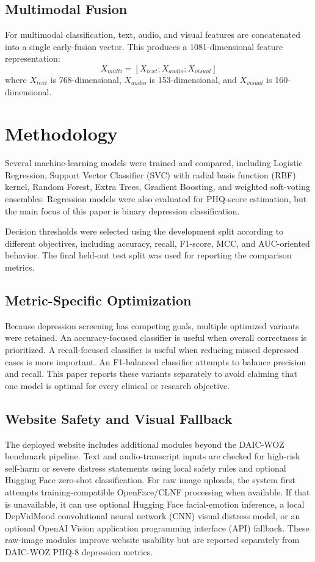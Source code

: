\documentclass[conference]{IEEEtran}
\begin{document}
\subsection{Multimodal Fusion}
For multimodal classification, text, audio, and visual features are concatenated into a single early-fusion vector. This produces a 1081-dimensional feature representation:
\begin{equation}
X_{multi} = [X_{text}; X_{audio}; X_{visual}]
\end{equation}
where $X_{text}$ is 768-dimensional, $X_{audio}$ is 153-dimensional, and $X_{visual}$ is 160-dimensional.

\section{Methodology}
Several machine-learning models were trained and compared, including Logistic Regression, Support Vector Classifier (SVC) with radial basis function (RBF) kernel, Random Forest, Extra Trees, Gradient Boosting, and weighted soft-voting ensembles. Regression models were also evaluated for PHQ-score estimation, but the main focus of this paper is binary depression classification.

Decision thresholds were selected using the development split according to different objectives, including accuracy, recall, F1-score, MCC, and AUC-oriented behavior. The final held-out test split was used for reporting the comparison metrics.

\subsection{Metric-Specific Optimization}
Because depression screening has competing goals, multiple optimized variants were retained. An accuracy-focused classifier is useful when overall correctness is prioritized. A recall-focused classifier is useful when reducing missed depressed cases is more important. An F1-balanced classifier attempts to balance precision and recall. This paper reports these variants separately to avoid claiming that one model is optimal for every clinical or research objective.

\subsection{Website Safety and Visual Fallback}
The deployed website includes additional modules beyond the DAIC-WOZ benchmark pipeline. Text and audio-transcript inputs are checked for high-risk self-harm or severe distress statements using local safety rules and optional Hugging Face zero-shot classification. For raw image uploads, the system first attempts training-compatible OpenFace/CLNF processing when available. If that is unavailable, it can use optional Hugging Face facial-emotion inference, a local DepVidMood convolutional neural network (CNN) visual distress model, or an optional OpenAI Vision application programming interface (API) fallback. These raw-image modules improve website usability but are reported separately from DAIC-WOZ PHQ-8 depression metrics.
\end{document}
